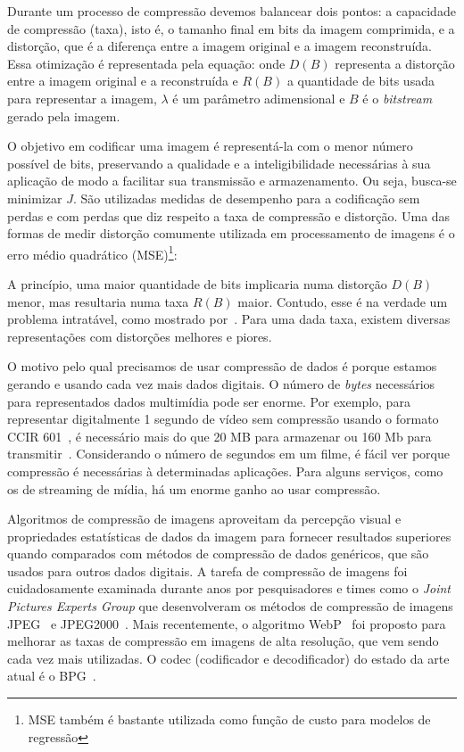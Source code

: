 Durante um processo de compressão devemos balancear dois pontos: a capacidade de compressão (taxa), isto é, o tamanho final em bits da imagem comprimida, e a distorção, que é a diferença entre a imagem original e a imagem reconstruída. Essa otimização é representada pela equação:  onde $D(B)$ representa a distorção entre a imagem original e a reconstruída e $R(B)$ a quantidade de bits usada para representar a imagem, $\lambda$ é um parâmetro adimensional e $B$ é o \textit{bitstream} gerado pela imagem.

O objetivo em codificar uma imagem é representá-la com o menor número possível de bits, preservando a qualidade e a inteligibilidade necessárias à sua aplicação de modo a facilitar sua transmissão e armazenamento. Ou seja, busca-se minimizar $J$. São utilizadas medidas de desempenho para a codificação sem perdas e com perdas que diz respeito a taxa de compressão e distorção. Uma das formas de medir distorção comumente utilizada em processamento de imagens é o erro médio quadrático (\acrshort{MSE})\footnote{MSE também é bastante utilizada como função de custo para modelos de regressão}: 
    
A princípio, uma maior quantidade de bits implicaria numa distorção $D(B)$ menor, mas resultaria numa taxa $R(B)$ maior. Contudo, esse é na verdade um problema intratável, como mostrado por~\cite{shoham1988}. Para uma dada taxa, existem diversas representações com distorções melhores e piores.

O motivo pelo qual precisamos de usar compressão de dados é porque estamos gerando e usando cada vez mais dados digitais. O número de \textit{bytes} necessários para representados dados multimídia pode ser enorme. Por exemplo, para representar digitalmente 1 segundo de vídeo sem compressão usando o formato CCIR 601~\cite{sayood2017introduction}, é necessário mais do que 20 MB para armazenar ou 160 Mb para transmitir~\cite{sayood2017introduction}. Considerando o número de segundos em um filme, é fácil ver porque compressão é necessárias à determinadas aplicações. Para alguns serviços, como os de streaming de mídia, há um enorme ganho ao usar compressão. 

Algoritmos de compressão de imagens aproveitam da percepção visual e propriedades estatísticas de dados da imagem para fornecer resultados superiores quando comparados com métodos de compressão de dados genéricos, que são usados para outros dados digitais. A tarefa de compressão de imagens foi cuidadosamente examinada durante anos por pesquisadores e times como o \textit{Joint Pictures Experts Group} que desenvolveram os métodos de compressão de imagens JPEG~\cite{jpeg1993} e JPEG2000~\cite{jpeg2000}. Mais recentemente, o algoritmo WebP~\cite{webp} foi proposto para melhorar as taxas de compressão em imagens de alta resolução, que vem sendo cada vez mais utilizadas. O codec (codificador e decodificador) do estado da arte atual é o BPG~\cite{bpg}.

